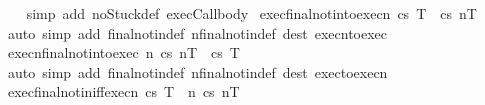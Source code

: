 \begin{isabellebody}
%
\isadelimproof
\ \ %
\endisadelimproof
%
\isatagproof
{}\isamarkupfalse%
\ {\isacharparenleft}simp\ add{\isacharcolon}\ noStuck{\isacharunderscore}def{\isacharprime}\ exec{\isacharunderscore}Call{\isacharunderscore}body{\isacharparenright}%
\endisatagproof
{\isafoldproof}%
%
\isadelimproof
\isanewline
%
\endisadelimproof
\isanewline
{}\isamarkupfalse%
\ exec{\isacharunderscore}final{\isacharunderscore}notin{\isacharunderscore}to{\isacharunderscore}execn{\isacharcolon}\ {\isachardoublequoteopen}{\isasymGamma}{\isasymturnstile}{\isasymlangle}c{\isacharcomma}s{\isasymrangle}\ {\isasymRightarrow}{\isasymnotin}T\ {\isasymLongrightarrow}\ {\isasymGamma}{\isasymturnstile}{\isasymlangle}c{\isacharcomma}s{\isasymrangle}\ {\isacharequal}n{\isasymRightarrow}{\isasymnotin}T{\isachardoublequoteclose}\isanewline
%
\isadelimproof
\ \ %
\endisadelimproof
%
\isatagproof
{}\isamarkupfalse%
\ {\isacharparenleft}auto\ simp\ add{\isacharcolon}\ final{\isacharunderscore}notin{\isacharunderscore}def\ nfinal{\isacharunderscore}notin{\isacharunderscore}def\ dest{\isacharcolon}\ execn{\isacharunderscore}to{\isacharunderscore}exec{\isacharparenright}%
\endisatagproof
{\isafoldproof}%
%
\isadelimproof
\isanewline
%
\endisadelimproof
\isanewline
{}\isamarkupfalse%
\ execn{\isacharunderscore}final{\isacharunderscore}notin{\isacharunderscore}to{\isacharunderscore}exec{\isacharcolon}\ {\isachardoublequoteopen}{\isasymforall}n{\isachardot}\ {\isasymGamma}{\isasymturnstile}{\isasymlangle}c{\isacharcomma}s{\isasymrangle}\ {\isacharequal}n{\isasymRightarrow}{\isasymnotin}T\ {\isasymLongrightarrow}\ {\isasymGamma}{\isasymturnstile}{\isasymlangle}c{\isacharcomma}s{\isasymrangle}\ {\isasymRightarrow}{\isasymnotin}T{\isachardoublequoteclose}\isanewline
%
\isadelimproof
\ \ %
\endisadelimproof
%
\isatagproof
{}\isamarkupfalse%
\ {\isacharparenleft}auto\ simp\ add{\isacharcolon}\ final{\isacharunderscore}notin{\isacharunderscore}def\ nfinal{\isacharunderscore}notin{\isacharunderscore}def\ dest{\isacharcolon}\ exec{\isacharunderscore}to{\isacharunderscore}execn{\isacharparenright}%
\endisatagproof
{\isafoldproof}%
%
\isadelimproof
\isanewline
%
\endisadelimproof
\isanewline
{}\isamarkupfalse%
\ exec{\isacharunderscore}final{\isacharunderscore}notin{\isacharunderscore}iff{\isacharunderscore}execn{\isacharcolon}\ {\isachardoublequoteopen}{\isasymGamma}{\isasymturnstile}{\isasymlangle}c{\isacharcomma}s{\isasymrangle}\ {\isasymRightarrow}{\isasymnotin}T\ {\isacharequal}\ {\isacharparenleft}{\isasymforall}n{\isachardot}\ {\isasymGamma}{\isasymturnstile}{\isasymlangle}c{\isacharcomma}s{\isasymrangle}\ {\isacharequal}n{\isasymRightarrow}{\isasymnotin}T{\isacharparenright}{\isachardoublequoteclose}\isanewline

\end{isabellebody}
